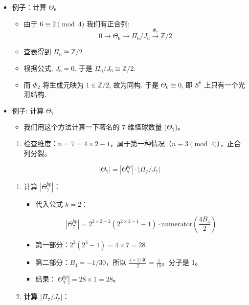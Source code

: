 \documentclass[
]{ctexart}
\providecommand{\tightlist}{%
  \setlength{\itemsep}{0pt}\setlength{\parskip}{0pt}}
\begin{document}
\begin{itemize}
\item
  例子：计算 \(\Theta_6\)

  \begin{itemize}
  \item
    由于 \(6\equiv 2 \pmod{4}\) 我们有正合列:\\
    \[
      0 \to \Theta_6 \to \Pi_6/J_6 \xrightarrow{\Phi_2} \mathbb{Z}/2
      \]
  \item
    查表得到 \(\Pi_6\cong\mathbb{Z}/2\)
  \item
    根据公式, \(J_6=0\). 于是 \(\Pi_6/J_6 \cong \mathbb{Z}/2\).
  \item
    而 \(\Phi_2\) 将生成元映为 \(1 \in \mathbb{Z}/2\), 故为同构. 于是
    \(\Theta_6\cong 0\), 即 \(S^6\) 上只有一个光滑结构.
  \end{itemize}
\item
  例子: 计算 \(\Theta_7\)

  \begin{itemize}
  \tightlist
  \item
    我们用这个方法计算一下著名的 7 维怪球数量 (\(\Theta_7\))。
  \end{itemize}

  \begin{enumerate}
  \def\labelenumi{\arabic{enumi}.}
  \tightlist
  \item
    检查维度：\(n=7 = 4\times2-1\)，属于第一种情况（\(n \equiv 3 \pmod 4\)），正合列分裂。
  \end{enumerate}

  \[
    |\Theta_7| = |\Theta_7^{bp}| \cdot |\Pi_7 / J_7|
    \]

  \begin{enumerate}
  \def\labelenumi{\arabic{enumi}.}
  \setcounter{enumi}{1}
  \tightlist
  \item
    计算 \(|\Theta_7^{bp}|\)：

    \begin{itemize}
    \item
      代入公式 \(k=2\)：

      \[
        |\Theta_7^{bp}| = 2^{2\times2-2}(2^{2\times2-1}-1) \cdot \text{numerator}\left(\frac{4B_4}{2}\right)
        \]
    \item
      第一部分：\(2^2 (2^3 - 1) = 4 \times 7 = 28\)
    \item
      第二部分：\(B_4 = -1/30\)，所以
      \(\frac{4\times1/30}{2} = \frac{1}{15}\)。分子是 1。
    \item
      结果：\(|\Theta_7^{bp}| = 28 \times 1 = 28\)。
    \end{itemize}
  \item
    \textbf{计算 \(|\Pi_7 / J_7|\)}：


\end{enumerate}
\end{itemize}
\end{document}

